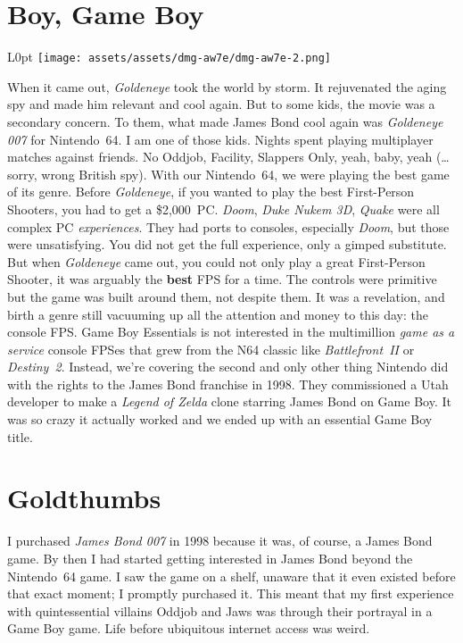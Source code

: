 \documentclass{book}
\begin{document}
\newpage\FloatBarrier\needspace{10mm}\section*{Boy, Game Boy}\nopagebreak[4]
\begin{wrapfigure}{L}{0pt} \texttt{[image: assets/assets/dmg-aw7e/dmg-aw7e-2.png]}\end{wrapfigure}
When it came out, \emph{Goldeneye} took the world by storm. It rejuvenated the aging spy and made him relevant and cool again. But to some kids, the movie was a secondary concern. To them, what made James Bond cool again was \emph{Goldeneye 007} for Nintendo~64. I am one of those kids. Nights spent playing multiplayer matches against friends. No Oddjob, Facility, Slappers Only, yeah, baby, yeah (… sorry, wrong British spy). With our Nintendo~64, we were playing the best game of its genre. Before \emph{Goldeneye}, if you wanted to play the best First-Person Shooters, you had to get a \$2,000~PC. \emph{Doom}, \emph{Duke Nukem 3D}, \emph{Quake} were all complex PC \emph{experiences}. They had ports to consoles, especially \emph{Doom}, but those were unsatisfying. You did not get the full experience, only a gimped substitute. But when \emph{Goldeneye} came out, you could not only play a great First-Person Shooter, it was arguably the \textbf{best} FPS for a time. The controls were primitive but the game was built around them, not despite them. It was a revelation, and birth a genre still vacuuming up all the attention and money to this day: the console FPS. Game Boy Essentials is not interested in the multimillion \emph{game as a service} console FPSes that grew from the N64 classic like \emph{Battlefront~II} or \emph{Destiny~2}. Instead, we’re covering the second and only other thing Nintendo did with the rights to the James Bond franchise in 1998. They commissioned a Utah developer to make a \emph{Legend of Zelda} clone starring James Bond on Game Boy. It was so crazy it actually worked and we ended up with an essential Game Boy title.

\FloatBarrier\needspace{10mm}\section*{Goldthumbs}\nopagebreak[4]

I purchased \emph{James Bond 007} in 1998 because it was, of course, a James Bond game. By then I had started getting interested in James Bond beyond the Nintendo~64 game. I saw the game on a shelf, unaware that it even existed before that exact moment; I promptly purchased it. This meant that my first experience with quintessential villains Oddjob and Jaws was through their portrayal in a Game Boy game. Life before ubiquitous internet access was weird.
\end{document}
